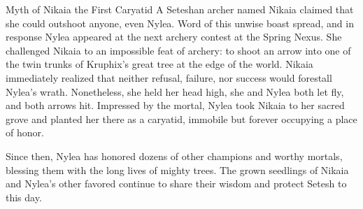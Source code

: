 \begin{DndComment}[float=h]{Myth of Nikaia the First Caryatid}
    A Seteshan archer named Nikaia claimed that she could outshoot anyone, even Nylea.
    Word of this unwise boast spread, and in response Nylea appeared at the next archery contest at the Spring Nexus.
    She challenged Nikaia to an impossible feat of archery: to shoot an arrow into one of the twin trunks of Kruphix's great tree at the edge of the world.
    Nikaia immediately realized that neither refusal, failure, nor success would forestall Nylea's wrath.
    Nonetheless, she held her head high, she and Nylea both let fly, and both arrows hit.
    Impressed by the mortal, Nylea took Nikaia to her sacred grove and planted her there as a caryatid, immobile but forever occupying a place of honor.

    Since then, Nylea has honored dozens of other champions and worthy mortals, blessing them with the long lives of mighty trees.
    The grown seedlings of Nikaia and Nylea's other favored continue to share their wisdom and protect Setesh to this day.
\end{DndComment}
